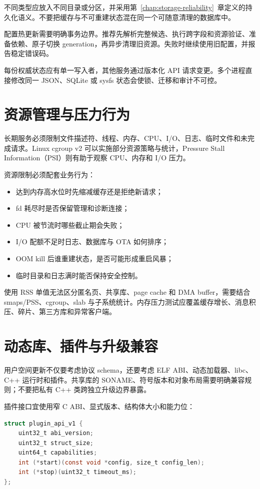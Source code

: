 不同类型应放入不同目录或分区，并采用第~\ref{chap:storage-reliability}~章定义的持久化语义。不要把缓存与不可重建状态混在同一个可随意清理的数据库中。

配置热更新需要明确事务边界。推荐先解析完整候选、执行跨字段和资源验证、准备依赖、原子切换 generation，再异步清理旧资源。失败时继续使用旧配置，并报告稳定错误码。

每份权威状态应有单一写入者，其他服务通过版本化 API 请求变更。多个进程直接修改同一 JSON、SQLite 或 sysfs 状态会使锁、迁移和审计不可控。

\section{资源管理与压力行为}

长期服务必须限制文件描述符、线程、内存、CPU、I/O、日志、临时文件和未完成请求。Linux cgroup v2 可以实施部分资源策略与统计\cite{linux-cgroup-v2}，Pressure Stall Information（PSI）则有助于观察 CPU、内存和 I/O 压力\cite{linux-psi}。

资源限制必须配套业务行为：

\begin{itemize}
  \item 达到内存高水位时先缩减缓存还是拒绝新请求；
  \item fd 耗尽时是否保留管理和诊断连接；
  \item CPU 被节流时哪些截止期会失败；
  \item I/O 配额不足时日志、数据库与 OTA 如何排序；
  \item OOM kill 后谁重建状态，是否可能形成重启风暴；
  \item 临时目录和日志满时能否保持安全控制。
\end{itemize}

使用 RSS 单值无法区分匿名页、共享库、page cache 和 DMA buffer，需要结合 smaps/PSS、cgroup、slab 与子系统统计。内存压力测试应覆盖缓存增长、消息积压、碎片、第三方库和异常客户端。

\section{动态库、插件与升级兼容}

用户空间更新不仅要考虑协议 schema，还要考虑 ELF ABI、动态加载器、libc、C++ 运行时和插件。共享库的 SONAME、符号版本和对象布局需要明确兼容规则；不要把私有 C++ 类跨独立升级边界暴露。

插件接口宜使用窄 C ABI、显式版本、结构体大小和能力位：

\begin{lstlisting}[language=C,caption={可演进插件描述符示意}]
struct plugin_api_v1 {
    uint32_t abi_version;
    uint32_t struct_size;
    uint64_t capabilities;
    int (*start)(const void *config, size_t config_len);
    int (*stop)(uint32_t timeout_ms);
};
\end{lstlisting}

